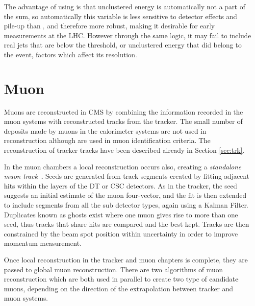 The advantage of using \MHT is that unclustered energy is automatically not a part of the sum, so automatically this variable is less sensitive to detector effects and pile-up than \met, and therefore more robust, making it desirable for early measurements at the LHC. However through the same logic, it may fail to include real jets that are below the threshold, or unclustered energy that did belong to the event, factors which affect its resolution. 

\section{Muon}

Muons are reconstructed in CMS by combining the information recorded in the muon systems with reconstructed tracks from the tracker. The small number of deposits made by muons in the calorimeter systems are not used in reconstruction although are used in muon identification criteria. The reconstruction of tracker tracks have been described already in Section  \ref{sec:trk}. 

In the muon chambers a local reconstruction occurs also, creating a \textit{standalone muon track}~\cite{muonperf}. Seeds are generated from track segments created by fitting adjacent hits within the layers of the DT or CSC detectors. As in the tracker, the seed suggests an initial estimate of the muon four-vector, and the fit is then extended to include segments from all the sub detector types, again using a Kalman Filter. Duplicates known as ghosts exist where one muon gives rise to more than one seed, thus tracks that share hits are compared and the best kept. Tracks are then constrained by the beam spot position within uncertainty in order to improve momentum measurement. 

Once local reconstruction in the tracker and muon chapters is complete, they are passed to global muon reconstruction. There are two algorithms of muon reconstruction which are both used in parallel to create two type of candidate muons, depending on the direction of the extrapolation between tracker and muon systems. 

